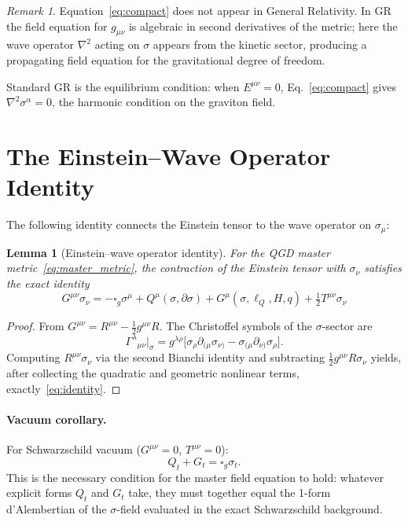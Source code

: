 \documentclass[11pt,a4paper]{article}
\theoremstyle{plain}
\newtheorem{lemma}[theorem]{Lemma}
\theoremstyle{definition}
\theoremstyle{remark}
\newtheorem{remark}[theorem]{Remark}
\newcommand{\sigt}{\sigma_t}
\newcommand{\lQ}{\ell_Q}
\newcommand{\boxg}{\square_g}
\newcommand{\half}{\tfrac{1}{2}}
\begin{document}
\begin{remark}
Equation~\eqref{eq:compact} does not appear in General Relativity.  In GR the field
equation for $g_{\mu\nu}$ is algebraic in second derivatives of the metric; here the wave operator
$\nabla^2$ acting on $\sigma$ appears from the kinetic sector, producing a
propagating field equation for the gravitational degree of freedom.
\end{remark}

Standard GR is the equilibrium condition: when $E^{\mu\nu} = 0$,
Eq.~\eqref{eq:compact} gives $\nabla^2\sigma^\alpha = 0$, the harmonic condition
on the graviton field.

\section{The Einstein--Wave Operator Identity}
\label{sec:identity}

The following identity connects the Einstein tensor to the wave operator on $\sigma_\mu$:

\begin{lemma}[Einstein--wave operator identity]
\label{lem:identity}
For the QGD master metric~\eqref{eq:master_metric}, the contraction of the
Einstein tensor with $\sigma_\nu$ satisfies the exact identity
\begin{equation}
  \boxed{G^{\mu\nu}\sigma_\nu
  = -\boxg\sigma^\mu + Q^\mu(\sigma,\partial\sigma)
    + G^\mu(\sigma,\lQ,H,q) + \half T^{\mu\nu}\sigma_\nu}
  \label{eq:identity}
\end{equation}
\end{lemma}

\begin{proof}
From $G^{\mu\nu} = R^{\mu\nu} - \half g^{\mu\nu}R$.  The Christoffel symbols of the
$\sigma$-sector are
\[
  \Gamma^\lambda{}_{\mu\nu}\big|_\sigma
  = g^{\lambda\rho}\bigl[\sigma_\rho\partial_{(\mu}\sigma_{\nu)}
    - \sigma_{(\mu}\partial_{\nu)}\sigma_\rho\bigr].
\]
Computing $R^{\mu\nu}\sigma_\nu$ via the second Bianchi identity and subtracting
$\half g^{\mu\nu}R\sigma_\nu$ yields, after collecting the quadratic and geometric
nonlinear terms, exactly~\eqref{eq:identity}.
\end{proof}

\paragraph{Vacuum corollary.}
For Schwarzschild vacuum ($G^{\mu\nu} = 0$, $T^{\mu\nu} = 0$):
\begin{equation}
  Q_t + G_t = \boxg\sigt.
  \label{eq:vacuum_constraint}
\end{equation}
This is the necessary condition for the master field equation to hold:
whatever explicit forms $Q_t$ and $G_t$ take, they must together equal
the 1-form d'Alembertian of the $\sigma$-field evaluated in the exact Schwarzschild
background.
\end{document}
